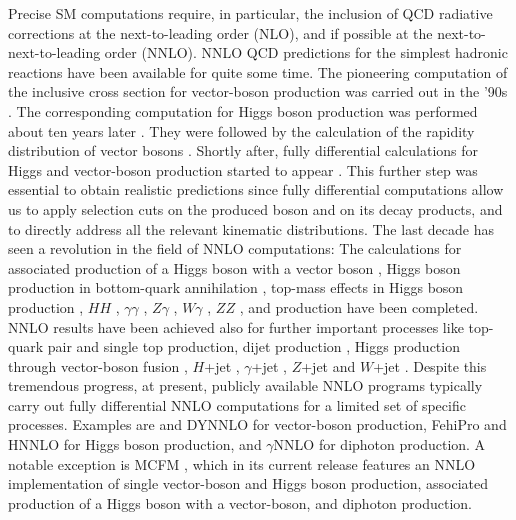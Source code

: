 \documentclass[english,11pt]{article}
\begin{document}
Precise SM computations require, in particular, the inclusion of QCD radiative corrections at the next-to-leading order (NLO), and if possible at the next-to-next-to-leading order (NNLO). NNLO QCD predictions for the simplest hadronic reactions have been available for quite some time. The pioneering computation of the inclusive cross section for vector-boson production was carried out in the '90s \cite{Hamberg:1990np}. The corresponding computation for Higgs boson production was performed about ten years later \cite{Harlander:2002wh,Anastasiou:2002yz,Ravindran:2003um}. They were followed by the calculation of the rapidity distribution of vector bosons \cite{Anastasiou:2003ds}.
Shortly after, fully differential calculations for Higgs and vector-boson production started to appear \cite{Anastasiou:2005qj,Melnikov:2006kv,Catani:2007vq,Anastasiou:2007mz,Grazzini:2008tf,Catani:2009sm}.
This further step was essential to obtain realistic predictions since fully differential computations allow us to apply selection cuts on the produced boson and on its decay products, and to directly address all the relevant kinematic distributions. 
The last decade has seen a revolution in the field of NNLO computations:
The calculations for associated production of a Higgs boson with a vector boson \cite{Ferrera:2011bk,Ferrera:2014lca,Ferrera:2017zex,Campbell:2016jau}, Higgs boson production in bottom-quark annihilation \cite{Harlander:2003ai,Harlander:2010cz,Harlander:2011fx,Buehler:2012cu}, top-mass effects in Higgs boson production \cite{Marzani:2008az,Harlander:2009mq,Harlander:2009my,Pak:2009dg,Neumann:2014nha}, $HH$ \cite{deFlorian:2013jea,deFlorian:2016uhr}, $\gamma\gamma$ \cite{Catani:2011qz,Campbell:2016yrh}, $Z\gamma$ \cite{Grazzini:2013bna,Grazzini:2015nwa,Campbell:2017aul}, $W\gamma$ \cite{Grazzini:2015nwa}, $ZZ$ \cite{Cascioli:2014yka,Grazzini:2015hta,Heinrich:2017bvg}, \ww{} \cite{Gehrmann:2014fva,Grazzini:2016ctr} and \wz{} \cite{Grazzini:2016swo,Grazzini:2017ckn} production have been completed.
NNLO results have been achieved also for further important processes like top-quark pair \cite{Czakon:2013goa,Czakon:2015owf} and single top \cite{Brucherseifer:2014ama} production, dijet production \cite{Currie:2017eqf}, Higgs production through vector-boson fusion \cite{Cacciari:2015jma}, $H$+jet \cite{Boughezal:2015aha,Caola:2015wna,Chen:2016zka}, $\gamma$+jet \cite{Campbell:2016lzl}, $Z$+jet \cite{Boughezal:2015ded,Gehrmann-DeRidder:2016jns} and $W$+jet \cite{Boughezal:2015dva}. Despite this tremendous progress, at present, publicly available NNLO programs typically carry out fully differential NNLO computations for a limited set of specific processes. Examples are \FEWZ{} \cite{Gavin:2012sy} and {\sc DYNNLO} \cite{Catani:2009sm} for vector-boson production, {\sc FehiPro} \cite{Anastasiou:2005qj,Anastasiou:2009kn} and {\sc HNNLO} \cite{Catani:2007vq,Grazzini:2008tf} for Higgs boson production, and {$\gamma$NNLO} \cite{Catani:2011qz} for diphoton production. A notable exception is {\sc MCFM} \cite{Boughezal:2016wmq}, which in its current release features an NNLO implementation of single vector-boson and Higgs boson production, associated production of a Higgs boson with a vector-boson, and diphoton production.
\end{document}
